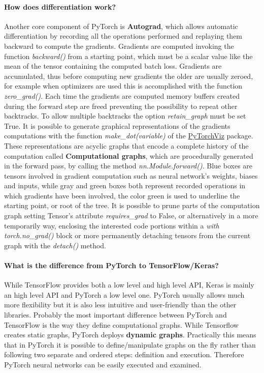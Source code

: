 \documentclass[11pt, a4paper, hidelinks]{report}
\begin{document}
\paragraph{How does differentiation work?}\label{par:what-is-autograd}
Another core component of PyTorch is \textbf{Autograd}, which allows automatic differentiation by recording all the operations performed and replaying them backward to compute the gradients.
Gradients are computed invoking the function \textit{backward()} from a starting point, which must be a scalar value like the mean of the tensor containing the computed batch loss.
Gradients are accumulated, thus before computing new gradients the older are usually zeroed, for example when optimizers are used this is accomplished with the function \textit{zero\_grad()}.
Each time the gradients are computed memory buffers created during the forward step are freed preventing the possibility to repeat other backtracks.
To allow multiple backtracks the option \textit{retain\_graph} must be set True.
It is possible to generate graphical representations of the gradients computations with the function \textit{make\_dot(variable)} of the \href{https://github.com/szagoruyko/pytorchviz}{PyTorchViz} package.
These representations are acyclic graphs that encode a complete history of the computation called \textbf{Computational graphs}, which are procedurally generated in the forward pass, by calling the method \textit{nn.Module.forward()}.
Blue boxes are tensors involved in gradient computation such as neural network's weights, biases and inputs, while gray and green boxes both represent recorded operations in which gradients have been involved, the color green is used to underline the starting point, or root of the tree.
It is possible to prune parts of the computation graph setting Tensor's attribute \textit{requires\_grad} to False, or alternatively in a more temporarily way, enclosing the interested code portions within a \textit{with torch.no\_grad()} block or more permanently detaching tensors from the current graph with the \textit{detach()} method.

\paragraph{What is the difference from PyTorch to TensorFlow/Keras?}\label{par:what-is-the-difference-from-pytorch-to-tensorflow/keras?}
While TensorFlow provides both a low level and high level API, Keras is mainly an high level API and PyTorch a low level one.
PyTorch usually allows much more flexibility but it is also less intuitive and user-friendly than the other libraries.
Probably the most important difference between PyTorch and TensorFlow is the way they define computational graphs.
While Tensorflow creates static graphs, PyTorch deploys \textbf{dynamic graphs}.
Practically this means that in PyTorch it is possible to define/manipulate graphs on the fly rather than following two separate and ordered steps: definition and execution.
Therefore PyTorch neural networks can be easily executed and examined.
\end{document}
